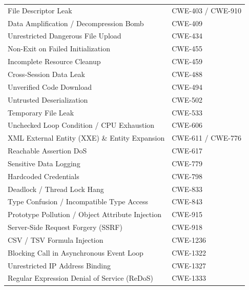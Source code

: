 \begin{table}[htbp]
\begin{tabular}{ll}
File Descriptor Leak & CWE-403 / CWE-910 \\
Data Amplification / Decompression Bomb & CWE-409 \\
Unrestricted Dangerous File Upload & CWE-434 \\
Non-Exit on Failed Initialization & CWE-455 \\
Incomplete Resource Cleanup & CWE-459 \\
Cross-Session Data Leak & CWE-488 \\
Unverified Code Download & CWE-494 \\
Untrusted Deserialization & CWE-502 \\
Temporary File Leak & CWE-533 \\
Unchecked Loop Condition / CPU Exhaustion & CWE-606 \\
XML External Entity (XXE) \& Entity Expansion & CWE-611 / CWE-776 \\
Reachable Assertion DoS & CWE-617 \\
Sensitive Data Logging & CWE-779 \\
Hardcoded Credentials & CWE-798 \\
Deadlock / Thread Lock Hang & CWE-833 \\
Type Confusion / Incompatible Type Access & CWE-843 \\
Prototype Pollution / Object Attribute Injection & CWE-915 \\
Server-Side Request Forgery (SSRF) & CWE-918 \\
CSV / TSV Formula Injection & CWE-1236 \\
Blocking Call in Asynchronous Event Loop & CWE-1322 \\
Unrestricted IP Address Binding & CWE-1327 \\
Regular Expression Denial of Service (ReDoS) & CWE-1333 \\
\bottomrule
\end{tabular}
\label{tab:sanitizers}
\end{table}